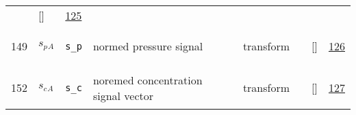 \begin{longtable}{|p{1cm}|p{3cm}|p{3cm}|p{7cm}|p{3.0cm}|p{3cm}|p{2cm}|p{1cm}|}
             & []
             & \hyperlink{"e:125"}{ 125 }
                 \\
    149
             & \hypertarget{"v:149"}{ $ {s_{p}}{_{A}} $}
             & \verb|s_p|
             & normed pressure signal
             & \begin{lay}transform \end{lay}
             & $  $
             & []
             & \hyperlink{"e:126"}{ 126 }
                 \\
    152
             & \hypertarget{"v:152"}{ $ {s_{c}}{_{A}} $}
             & \verb|s_c|
             & noremed concentration signal vector
             & \begin{lay}transform \end{lay}
             & $  $
             & []
             & \hyperlink{"e:127"}{ 127 }
                 \\
    \end{longtable}